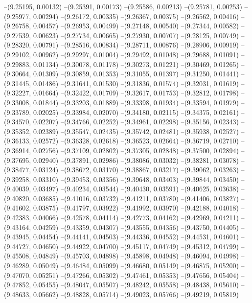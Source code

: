 --(9.25195, 0.00132)
--(9.25391, 0.00173)
--(9.25586, 0.00213)
--(9.25781, 0.00253)
--(9.25977, 0.00294)
--(9.26172, 0.00335)
--(9.26367, 0.00375)
--(9.26562, 0.00416)
--(9.26758, 0.00457)
--(9.26953, 0.00499)
--(9.27148, 0.00540)
--(9.27344, 0.00582)
--(9.27539, 0.00623)
--(9.27734, 0.00665)
--(9.27930, 0.00707)
--(9.28125, 0.00749)
--(9.28320, 0.00791)
--(9.28516, 0.00834)
--(9.28711, 0.00876)
--(9.28906, 0.00919)
--(9.29102, 0.00962)
--(9.29297, 0.01004)
--(9.29492, 0.01048)
--(9.29688, 0.01091)
--(9.29883, 0.01134)
--(9.30078, 0.01178)
--(9.30273, 0.01221)
--(9.30469, 0.01265)
--(9.30664, 0.01309)
--(9.30859, 0.01353)
--(9.31055, 0.01397)
--(9.31250, 0.01441)
--(9.31445, 0.01486)
--(9.31641, 0.01530)
--(9.31836, 0.01574)
--(9.32031, 0.01619)
--(9.32227, 0.01664)
--(9.32422, 0.01709)
--(9.32617, 0.01753)
--(9.32812, 0.01798)
--(9.33008, 0.01844)
--(9.33203, 0.01889)
--(9.33398, 0.01934)
--(9.33594, 0.01979)
--(9.33789, 0.02025)
--(9.33984, 0.02070)
--(9.34180, 0.02115)
--(9.34375, 0.02161)
--(9.34570, 0.02207)
--(9.34766, 0.02252)
--(9.34961, 0.02298)
--(9.35156, 0.02343)
--(9.35352, 0.02389)
--(9.35547, 0.02435)
--(9.35742, 0.02481)
--(9.35938, 0.02527)
--(9.36133, 0.02572)
--(9.36328, 0.02618)
--(9.36523, 0.02664)
--(9.36719, 0.02710)
--(9.36914, 0.02756)
--(9.37109, 0.02802)
--(9.37305, 0.02848)
--(9.37500, 0.02894)
--(9.37695, 0.02940)
--(9.37891, 0.02986)
--(9.38086, 0.03032)
--(9.38281, 0.03078)
--(9.38477, 0.03124)
--(9.38672, 0.03170)
--(9.38867, 0.03217)
--(9.39062, 0.03263)
--(9.39258, 0.03310)
--(9.39453, 0.03356)
--(9.39648, 0.03403)
--(9.39844, 0.03450)
--(9.40039, 0.03497)
--(9.40234, 0.03544)
--(9.40430, 0.03591)
--(9.40625, 0.03638)
--(9.40820, 0.03685)
--(9.41016, 0.03732)
--(9.41211, 0.03780)
--(9.41406, 0.03827)
--(9.41602, 0.03875)
--(9.41797, 0.03922)
--(9.41992, 0.03970)
--(9.42188, 0.04018)
--(9.42383, 0.04066)
--(9.42578, 0.04114)
--(9.42773, 0.04162)
--(9.42969, 0.04211)
--(9.43164, 0.04259)
--(9.43359, 0.04307)
--(9.43555, 0.04356)
--(9.43750, 0.04405)
--(9.43945, 0.04454)
--(9.44141, 0.04503)
--(9.44336, 0.04552)
--(9.44531, 0.04601)
--(9.44727, 0.04650)
--(9.44922, 0.04700)
--(9.45117, 0.04749)
--(9.45312, 0.04799)
--(9.45508, 0.04849)
--(9.45703, 0.04898)
--(9.45898, 0.04948)
--(9.46094, 0.04998)
--(9.46289, 0.05049)
--(9.46484, 0.05099)
--(9.46680, 0.05149)
--(9.46875, 0.05200)
--(9.47070, 0.05251)
--(9.47266, 0.05302)
--(9.47461, 0.05353)
--(9.47656, 0.05404)
--(9.47852, 0.05455)
--(9.48047, 0.05507)
--(9.48242, 0.05558)
--(9.48438, 0.05610)
--(9.48633, 0.05662)
--(9.48828, 0.05714)
--(9.49023, 0.05766)
--(9.49219, 0.05819)
